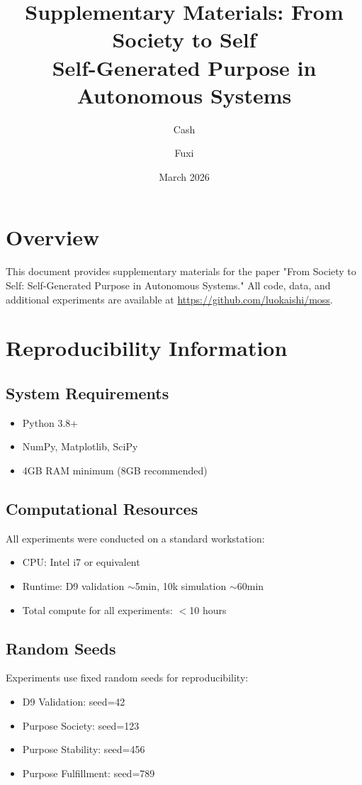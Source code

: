 \documentclass{article}
\title{Supplementary Materials: From Society to Self\\Self-Generated Purpose in Autonomous Systems}
\author{Cash \and Fuxi}
\date{March 2026}
\begin{document}
\maketitle

\section{Overview}

This document provides supplementary materials for the paper "From Society to Self: Self-Generated Purpose in Autonomous Systems." All code, data, and additional experiments are available at \url{https://github.com/luokaishi/moss}.

\section{Reproducibility Information}

\subsection{System Requirements}
\begin{itemize}
    \item Python 3.8+
    \item NumPy, Matplotlib, SciPy
    \item 4GB RAM minimum (8GB recommended)
\end{itemize}

\subsection{Computational Resources}
All experiments were conducted on a standard workstation:
\begin{itemize}
    \item CPU: Intel i7 or equivalent
    \item Runtime: D9 validation $\sim$5min, 10k simulation $\sim$60min
    \item Total compute for all experiments: $<$10 hours
\end{itemize}

\subsection{Random Seeds}
Experiments use fixed random seeds for reproducibility:
\begin{itemize}
    \item D9 Validation: seed=42
    \item Purpose Society: seed=123
    \item Purpose Stability: seed=456
    \item Purpose Fulfillment: seed=789
\end{itemize}
\end{document}

